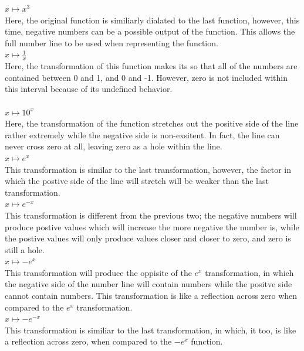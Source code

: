 \documentclass[12pt]{article}
\begin{document}
$x \mapsto x^3$ \\
Here, the original function is similiarly dialated to the last function, however, this time, negative numbers can be a possible output of the function. This allows the full number line to be used when representing the function.
\\

$x \mapsto \frac{1}{x}$ \\
Here, the transformation of this function makes its so that all of the numbers are contained between 0 and 1, and 0 and -1. However, zero is not included within this interval because of its undefined behavior. \\
 \\

$x \mapsto 10^x$ \\
Here, the transformation of the function stretches out the positive side of the line rather extremely while the negative side is non-exsitent. In fact, the line can never cross zero at all, leaving zero as a hole within the line. \\

$x \mapsto e^x$ \\
This transformation is similar to the last transformation, however, the factor in which the postive side of the line will stretch will be weaker than the last transformation.\\

$x \mapsto e^{-x}$ \\
This transformation is different from the previous two; the negative numbers will produce postive values which will increase the more negative the number is, while the postive values will only produce values closer and closer to zero, and zero is still a hole.\\

$x \mapsto -e^x$ \\
This transformation will produce the oppisite of the $e^x$ transformation, in which the negative side of the number line will contain numbers while the positve side cannot contain numbers.
This transformation is like a reflection across zero when compared to the $e^x$ transformation. \\

$x \mapsto -e^{-x}$ \\
This transformation is similiar to the last transformation, in which, it too, is like a reflection across zero, when compared to the $-e^x$ function.\\
\end{document}
